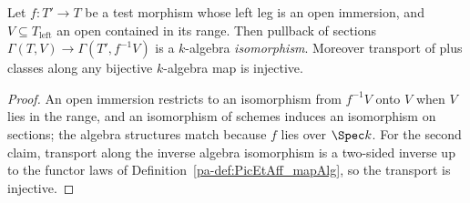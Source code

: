 \begin{lemma}
  \label{pa-lem:appLEAlgEquiv}
  \leanok

  Let \(f \colon T' \to T\) be a test morphism whose left leg is an open immersion, and
  \(V \subseteq T_{\mathrm{left}}\) an open contained in its range. Then pullback of sections
  \(\Gamma(T,V) \to \Gamma(T', f^{-1}V)\) is a \(k\)-algebra \emph{isomorphism}. Moreover
  transport of plus classes along any bijective \(k\)-algebra map is injective.
\end{lemma}
\begin{proof}
  \leanok
  An open immersion restricts to an isomorphism from \(f^{-1}V\) onto \(V\) when
  \(V\) lies in the range, and an isomorphism of schemes induces an isomorphism on sections;
  the algebra structures match because \(f\) lies over \(\Spec k\). For the second claim,
  transport along the inverse algebra isomorphism is a two-sided inverse up to the functor
  laws of Definition~\ref{pa-def:PicEtAff_mapAlg}, so the transport is injective.
\end{proof}

